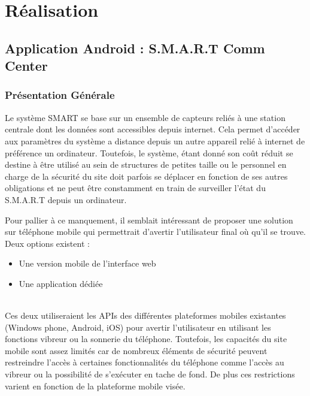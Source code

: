 \chapter{Réalisation}



\section{Application Android : S.M.A.R.T Comm Center}

\subsection{Présentation Générale}

	Le système SMART se base sur un ensemble de capteurs reliés à une station centrale dont les données sont accessibles depuis internet. Cela permet d'accéder aux paramètres du système a distance depuis un autre appareil relié à internet de préférence un ordinateur. Toutefois, le système, étant donné son coût réduit se destine à être utilisé au sein de structures de petites taille ou le personnel en charge de la sécurité du site doit parfois se déplacer en fonction de ses autres obligations et ne peut être constamment en train de surveiller l'état du S.M.A.R.T depuis un ordinateur. 
	
	Pour pallier à ce manquement, il semblait intéressant de proposer une solution sur téléphone mobile qui permettrait d'avertir l'utilisateur final où qu'il se trouve. Deux options existent :
	~\\
	\begin{itemize}
	
	\item Une version mobile de l'interface web
	\item Une application dédiée	
		
	\end{itemize}
	~\\
	 Ces deux utiliseraient les APIs des différentes plateformes mobiles existantes (Windows phone, Android, iOS) pour avertir l'utilisateur en utilisant les fonctions vibreur ou la sonnerie du téléphone.
	 Toutefois, les capacités du site mobile sont assez limités car de nombreux éléments de sécurité peuvent restreindre l'accès à certaines fonctionnalités du téléphone comme l'accès au vibreur ou la possibilité de s'exécuter en tache de fond. De plus ces restrictions varient en fonction de la plateforme mobile visée.
	
